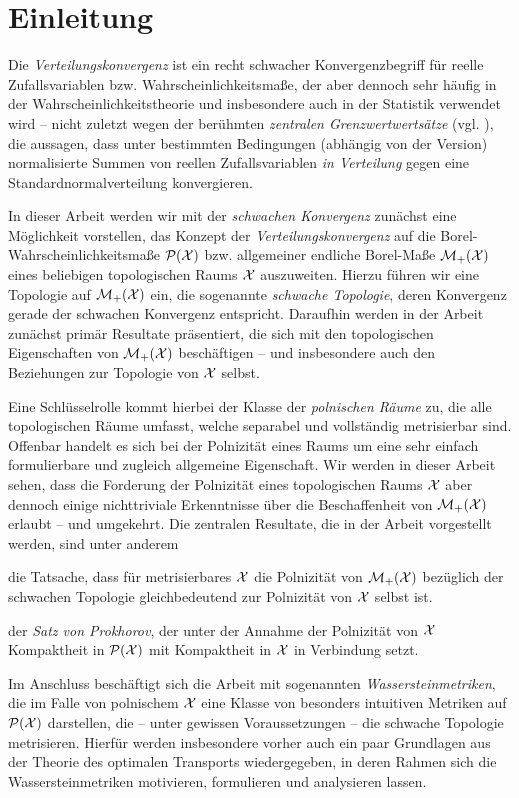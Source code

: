 \documentclass[../thesis/thesis.tex]{subfiles}
\begin{document}
	
	\chapter{Einleitung}
	
	Die \emph{Verteilungskonvergenz} ist ein recht schwacher Konvergenzbegriff für reelle Zufallsvariablen bzw. Wahrscheinlichkeitsmaße, der
	aber dennoch sehr häufig in der Wahrscheinlichkeitstheorie und insbesondere auch in der Statistik verwendet wird -- nicht zuletzt
	wegen der berühmten \emph{zentralen Grenzwertwertsätze} (vgl. \cite[Kapitel 7]{Henze.2016}), die aussagen, dass unter bestimmten Bedingungen (abhängig von der Version) normalisierte Summen von reellen Zufallsvariablen \emph{in Verteilung} gegen eine Standardnormalverteilung konvergieren.
	
	In dieser Arbeit werden wir mit der \emph{schwachen Konvergenz} zunächst eine Möglichkeit vorstellen, das Konzept der \emph{Verteilungskonvergenz} 
	auf die Borel-Wahrscheinlichkeitsmaße $\mathcal{P}(\mathcal{X})$ bzw. allgemeiner endliche Borel-Maße $\mathcal{M}_{+}(\mathcal{X})$ eines 
	beliebigen topologischen Raums $\mathcal{X}$ auszuweiten. Hierzu führen wir eine Topologie
	auf $\mathcal{M}_{+}(\mathcal{X})$ ein, die sogenannte \emph{schwache Topologie}, deren Konvergenz gerade der schwachen Konvergenz entspricht.
	Daraufhin werden in der Arbeit zunächst primär Resultate präsentiert, die sich mit den topologischen Eigenschaften 
	von $\mathcal{M}_{+}(\mathcal{X})$ beschäftigen -- und insbesondere auch den Beziehungen zur Topologie von $\mathcal{X}$ selbst.
	
	Eine Schlüsselrolle kommt hierbei der Klasse der \emph{polnischen Räume} zu, die alle topologischen Räume umfasst, welche separabel und vollständig 
	metrisierbar sind. Offenbar handelt es sich bei der Polnizität eines Raums um eine sehr einfach formulierbare und zugleich allgemeine Eigenschaft. 
	Wir werden in dieser Arbeit sehen, dass die Forderung der Polnizität 
	eines topologischen Raums $\mathcal{X}$ aber dennoch einige nichttriviale Erkenntnisse über die Beschaffenheit von $\mathcal{M}_{+}(\mathcal{X})$ erlaubt -- und umgekehrt.
	Die zentralen Resultate, die in der Arbeit vorgestellt werden, sind unter anderem
	\begin{itemizethm}
		\item die Tatsache, dass für metrisierbares $\mathcal{X}$ die Polnizität von $\mathcal{M}_{+}(\mathcal{X})$ bezüglich der schwachen Topologie
		gleichbedeutend zur Polnizität von $\mathcal{X}$ selbst ist.
		\item der \emph{Satz von Prokhorov}, der unter der Annahme der Polnizität von $\mathcal{X}$ Kompaktheit in $\mathcal{P}(\mathcal{X})$ mit Kompaktheit in $\mathcal{X}$ in Verbindung setzt.
	\end{itemizethm}
	Im Anschluss beschäftigt sich die Arbeit mit sogenannten \emph{Wassersteinmetriken}, die im Falle von polnischem $\mathcal{X}$ eine Klasse von 
	besonders intuitiven Metriken auf $\mathcal{P}(\mathcal{X})$ darstellen, die -- unter gewissen Voraussetzungen -- die schwache Topologie metrisieren. 
	Hierfür werden insbesondere vorher auch ein paar Grundlagen aus der Theorie des optimalen Transports wiedergegeben, in deren Rahmen sich 
	die Wassersteinmetriken motivieren, formulieren und analysieren lassen.
	
\end{document}
